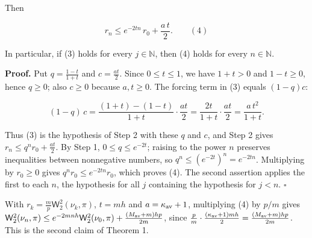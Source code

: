 \documentclass[11pt,a4paper]{report}
\begin{document}
Then


\[r_n\le e^{-2tn}\,r_0+\frac{a\,t}2.\qquad(4)\]


In particular, if (3) holds for every \(j\in\mathbb N\), then (4) holds for every \(n\in\mathbb N\).




\textbf{Proof.} Put \(q=\frac{1-t}{1+t}\) and \(c=\frac{at}2\). Since \(0\le t\le1\), we have \(1+t>0\) and \(1-t\ge0\), hence \(q\ge0\); also \(c\ge0\) because \(a,t\ge0\). The forcing term in (3) equals \((1-q)c\):


\[(1-q)\,c=\frac{(1+t)-(1-t)}{1+t}\cdot\frac{at}2=\frac{2t}{1+t}\cdot\frac{at}2=\frac{a\,t^2}{1+t}.\]


Thus (3) is the hypothesis of Step 2 with these \(q\) and \(c\), and Step 2 gives \(r_n\le q^nr_0+\frac{at}2\). By Step 1, \(0\le q\le e^{-2t}\); raising to the power \(n\) preserves inequalities between nonnegative numbers, so \(q^n\le(e^{-2t})^n=e^{-2tn}\). Multiplying by \(r_0\ge0\) gives \(q^nr_0\le e^{-2tn}r_0\), which proves (4). The second assertion applies the first to each \(n\), the hypothesis for all \(j\) containing the hypothesis for \(j<n\). \(\square\)




With \(r_k=\frac mp\mathsf W_2^2(\nu_k,\pi)\), \(t=mh\) and \(a=\kappa_{\rm av}+1\), multiplying (4) by \(p/m\) gives \(\mathsf W_2^2(\nu_n,\pi)\le e^{-2mnh}\mathsf W_2^2(\nu_0,\pi)+\frac{(M_{\rm av}+m)hp}{2m}\), since \(\frac pm\cdot\frac{(\kappa_{\rm av}+1)mh}2=\frac{(M_{\rm av}+m)hp}{2m}\). This is the second claim of Theorem 1.
\end{document}
